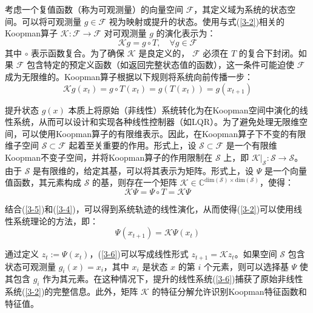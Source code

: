 \documentclass[lang=chs, degree=master, blindreview=false, winfonts=true]{yanputhesis}
\begin{document}
考虑一个复值函数（称为可观测量）的向量空间 \( \mathcal{F} \)，其定义域为系统的状态空间。可以将可观测量 \( g \in \mathcal{F} \) 视为映射或提升的状态。使用与式(\ref{3-2})相关的Koopman算子 \( \mathcal{K}: \mathcal{F} \to \mathcal{F} \) 对可观测量 \( g \) 的演化表示为：
\begin{equation}
	\mathcal{K}g = g \circ T, \quad \forall g \in \mathcal{F}
	\label{3-3}
\end{equation}
其中 \( \circ \) 表示函数复合。为了确保 \( \mathcal{K} \) 是良定义的， \( \mathcal{F} \) 必须在 \( T \) 的复合下封闭。如果 \( \mathcal{F} \) 包含特定的预定义函数（如返回完整状态值的函数），这一条件可能迫使 \( \mathcal{F} \) 成为无限维的。Koopman算子根据以下规则将系统向前传播一步：
\begin{equation}
	\mathcal{K}g(x_t) = g \circ T(x_t) = g(T(x_t)) = g(x_{t+1})
	\label{3-4}
\end{equation}

提升状态 \( g(x) \) 本质上将原始（非线性）系统转化为在Koopman空间中演化的线性系统，从而可以设计和实现各种线性控制器（如LQR）。为了避免处理无限维空间，可以使用Koopman算子的有限维表示。因此，在Koopman算子下不变的有限维子空间 \( \mathcal{S} \subset \mathcal{F} \) 起着至关重要的作用。形式上，设 \( \mathcal{S} \subset \mathcal{F} \) 是一个有限维Koopman不变子空间，并将Koopman算子的作用限制在 \( \mathcal{S} \) 上，即 \( \mathcal{K} \rvert_\mathcal{S}: \mathcal{S} \to \mathcal{S} \)。由于 \( \mathcal{S} \) 是有限维的，给定其基，可以将其表示为矩阵。形式上，设 \( \Psi \) 是一个向量值函数，其元素构成 \( \mathcal{S} \) 的基，则存在一个矩阵 \( \mathcal{K} \in \mathbb{C}^{\text{dim}(\mathcal{S}) \times \text{dim}(\mathcal{S})} \)，使得：
\begin{equation}
	\mathcal{K}\Psi = \Psi \circ T = \mathcal{K}\Psi
	\label{3-5}
\end{equation}

结合(\ref{3-5})和(\ref{3-4})，可以得到系统轨迹的线性演化，从而使得(\ref{3-2})可以使用线性系统理论的方法，即：
\begin{equation}
	\Psi(x_{t+1}) = \mathcal{K}\Psi(x_t)\label{3-6}
\end{equation}

通过定义 \( z_t := \Psi(x_t) \)，(\ref{3-6})可以写成线性形式 \( z_{t+1} = \mathcal{K}z_t \)。如果空间 \( \mathcal{S} \) 包含状态可观测量 \( g_i(x) = x_i \)，其中 \( x_i \) 是状态 \( x \) 的第 \( i \) 个元素，则可以选择基 \( \Psi \) 使其包含 \( g_i \) 作为其元素。在这种情况下，提升的线性系统(\ref{3-6})捕获了原始非线性系统(\ref{3-2})的完整信息。此外，矩阵 \( \mathcal{K} \) 的特征分解允许识别Koopman特征函数和特征值。
\end{document}

